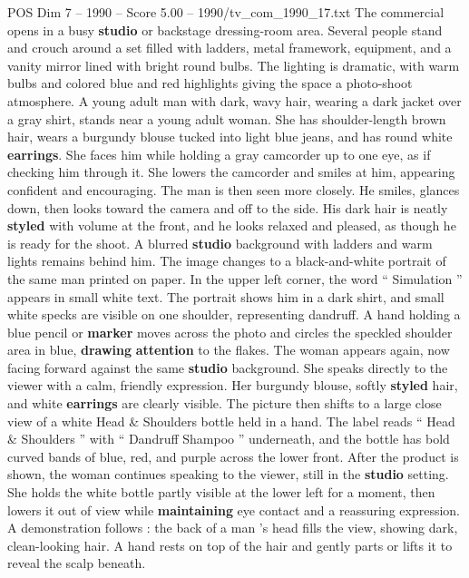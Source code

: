 \begin{textsample}{POS Dim 7 – 1990 – Score 5.00 – 1990/tv\_com\_1990\_17.txt}  \label{ex:f7_pos_070}
The commercial opens in a busy \textbf{studio} or backstage dressing-room area.
Several people stand and crouch around a set filled with ladders, metal framework, equipment, and a vanity mirror lined with bright round bulbs.
The lighting is dramatic, with warm bulbs and colored blue and red highlights giving the space a photo-shoot atmosphere.
A young adult man with dark, wavy hair, wearing a dark jacket over a gray shirt, stands near a young adult woman.
She has shoulder-length brown hair, wears a burgundy blouse tucked into light blue jeans, and has round white \textbf{earrings}.
She faces him while holding a gray camcorder up to one eye, as if checking him through it.
She lowers the camcorder and smiles at him, appearing confident and encouraging.
The man is then seen more closely.
He smiles, glances down, then looks toward the camera and off to the side.
His dark hair is neatly \textbf{styled} with volume at the front, and he looks relaxed and pleased, as though he is ready for the shoot.
A blurred \textbf{studio} background with ladders and warm lights remains behind him.
The image changes to a black-and-white portrait of the same man printed on paper.
In the upper left corner, the word “ Simulation ” appears in small white text.
The portrait shows him in a dark shirt, and small white specks are visible on one shoulder, representing dandruff.
A hand holding a blue pencil or \textbf{marker} moves across the photo and circles the speckled shoulder area in blue, \textbf{drawing} \textbf{attention} to the flakes.
The woman appears again, now facing forward against the same \textbf{studio} background.
She speaks directly to the viewer with a calm, friendly expression.
Her burgundy blouse, softly \textbf{styled} hair, and white \textbf{earrings} are clearly visible.
The picture then shifts to a large close view of a white Head \& Shoulders bottle held in a hand.
The label reads “ Head \& Shoulders ” with “ Dandruff Shampoo ” underneath, and the bottle has bold curved bands of blue, red, and purple across the lower front.
After the product is shown, the woman continues speaking to the viewer, still in the \textbf{studio} setting.
She holds the white bottle partly visible at the lower left for a moment, then lowers it out of view while \textbf{maintaining} eye contact and a reassuring expression.
A demonstration follows : the back of a man ’s head fills the view, showing dark, clean-looking hair.
A hand rests on top of the hair and gently parts or lifts it to reveal the scalp beneath.

\end{textsample}
